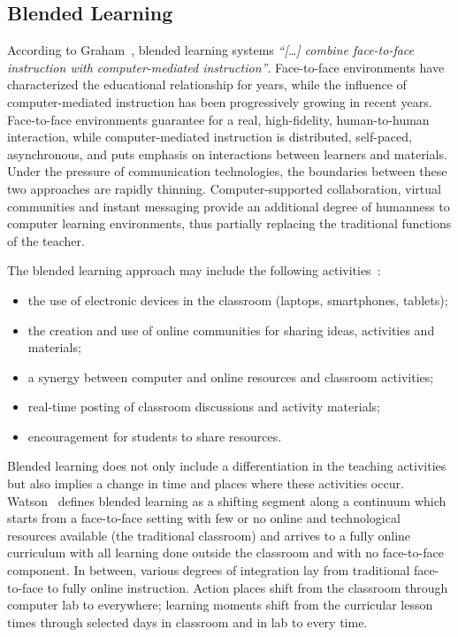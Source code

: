 \documentclass[journal]{IEEEtran}
\begin{document}
\subsection{Blended Learning}
\label{subsec:BL}

According to Graham~\cite{graham2006blended}, blended learning systems \textit{``[\ldots] combine face-to-face instruction with computer-mediated instruction''}. Face-to-face environments have characterized the educational relationship for years, while the influence of computer-mediated instruction has been progressively growing in recent years. Face-to-face environments guarantee for a real, high-fidelity, human-to-human interaction, while computer-mediated instruction is distributed, self-paced, asynchronous, and puts emphasis on interactions between learners and materials. Under the pressure of communication technologies, the boundaries between these two approaches are rapidly thinning. Computer-supported collaboration, virtual communities and instant messaging provide an additional degree of humanness to computer learning environments, thus partially replacing the traditional functions of the teacher. 

The blended learning approach may include the following activities~\cite{louise2016impact}:
\begin{itemize}
	\item the use of electronic devices in the classroom (laptops, smartphones, tablets);
	\item the creation and use of online communities for sharing ideas, activities and materials;
	\item a synergy between computer and online resources and classroom activities;
	\item real-time posting of classroom discussions and activity materials;
	\item encouragement for students to share resources.
\end{itemize}

Blended learning does not only include a differentiation in the teaching activities but also implies a change in time and places where these activities occur. Watson~\cite{watson2008blended} defines blended learning as a shifting segment along a continuum which starts from a face-to-face setting with few or no online and technological resources available (the traditional classroom) and arrives to a fully online curriculum with all learning done outside the classroom and with no face-to-face component. In between,  various degrees of integration lay from traditional face-to-face to fully online instruction. Action places shift from the classroom through computer lab to everywhere; learning moments shift from the curricular lesson times through selected days in classroom and in lab to every time. 
\end{document}
